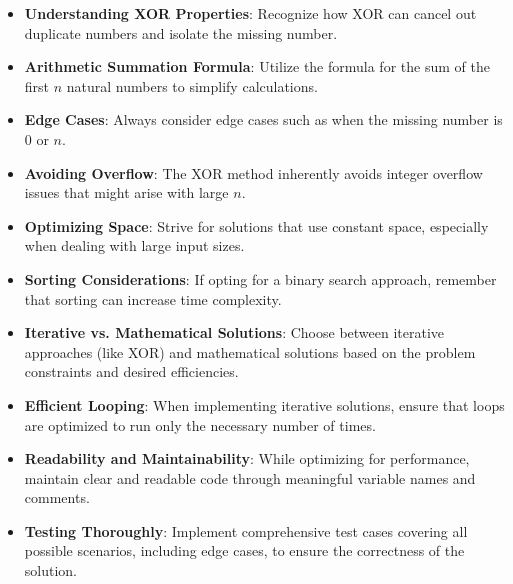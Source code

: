 \begin{itemize}
    \item \textbf{Understanding XOR Properties}: Recognize how XOR can cancel out duplicate numbers and isolate the missing number.
    
    \item \textbf{Arithmetic Summation Formula}: Utilize the formula for the sum of the first \(n\) natural numbers to simplify calculations.
    
    \item \textbf{Edge Cases}: Always consider edge cases such as when the missing number is \(0\) or \(n\).
    
    \item \textbf{Avoiding Overflow}: The XOR method inherently avoids integer overflow issues that might arise with large \(n\).
    
    \item \textbf{Optimizing Space}: Strive for solutions that use constant space, especially when dealing with large input sizes.
    
    \item \textbf{Sorting Considerations}: If opting for a binary search approach, remember that sorting can increase time complexity.
    
    \item \textbf{Iterative vs. Mathematical Solutions}: Choose between iterative approaches (like XOR) and mathematical solutions based on the problem constraints and desired efficiencies.
    
    \item \textbf{Efficient Looping}: When implementing iterative solutions, ensure that loops are optimized to run only the necessary number of times.
    
    \item \textbf{Readability and Maintainability}: While optimizing for performance, maintain clear and readable code through meaningful variable names and comments.
    
    \item \textbf{Testing Thoroughly}: Implement comprehensive test cases covering all possible scenarios, including edge cases, to ensure the correctness of the solution.
\end{itemize}

